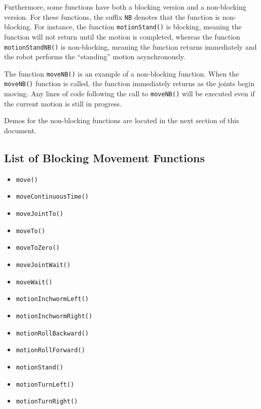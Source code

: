 \documentclass{article}
\begin{document}
Furthermore, some functions have both a blocking version and a non-blocking
version. For these functions, the suffix \texttt{NB} denotes that the function
is non-blocking. For instance, the function \texttt{motionStand()} is blocking,
meaning the function will not return until the motion is completed, whereas
the function \texttt{motionStandNB()} is non-blocking, meaning the function
returns immediately and the robot performs the ``standing'' motion
asynchronously.

The function \texttt{moveNB()} is an example of a non-blocking function. When
the \texttt{moveNB()} function is called, the function immediately returns 
as the joints begin moving. Any lines of code following the call to 
\texttt{moveNB()} will be executed even if the current motion is still in
progress. 

Demos for the non-blocking functions are located in the next section of
this document.

\subsection{List of Blocking Movement Functions}
\begin{itemize}
\item \texttt{move()}
\item \texttt{moveContinuousTime()}
\item \texttt{moveJointTo()}
\item \texttt{moveTo()}
\item \texttt{moveToZero()}
\item \texttt{moveJointWait()}
\item \texttt{moveWait()}
\item \texttt{motionInchwormLeft()}
\item \texttt{motionInchwormRight()}
\item \texttt{motionRollBackward()}
\item \texttt{motionRollForward()}
\item \texttt{motionStand()}
\item \texttt{motionTurnLeft()}
\item \texttt{motionTurnRight()}
\end{itemize}
\end{document}
